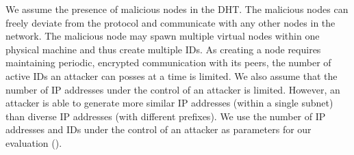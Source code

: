 We assume the presence of malicious nodes in the DHT. The malicious nodes can freely deviate from the protocol and communicate with any other nodes in the network. The malicious node may spawn multiple virtual nodes within one physical machine and thus create multiple IDs. As creating a node requires maintaining periodic, encrypted communication with its peers, the number of active IDs an attacker can posses at a time is limited. We also assume that the number of IP addresses under the control of an attacker is limited. However, an attacker is able to generate more similar IP addresses (within a single subnet) than diverse IP addresses (with different prefixes). We use the number of IP addresses and IDs under the control of an attacker as parameters for our evaluation (). 
